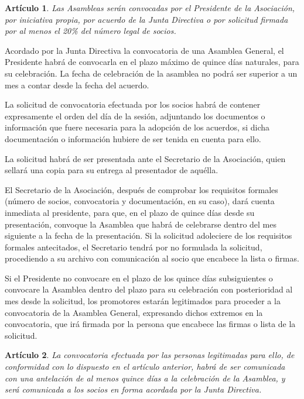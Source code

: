 \documentclass[a4paper,12pt]{article}
\theoremstyle{mystyle}		%
\newtheorem{art}{Artículo}	%
\begin{document}
\begin{onehalfspace}
\begin{art}
Las Asambleas serán convocadas por el Presidente de la Asociación, por iniciativa propia, por acuerdo de la Junta Directiva o por solicitud firmada por al menos el 20\% del número legal de socios.
\end{art}

Acordado por la Junta Directiva la convocatoria de una Asamblea General, el Presidente habrá de convocarla en el plazo máximo de quince días naturales, para su celebración. La fecha de celebración de la asamblea no podrá ser superior a un mes a contar desde la fecha del acuerdo.

La solicitud de convocatoria efectuada por los socios habrá de contener expresamente el orden del día de la sesión, adjuntando los documentos o información que fuere necesaria para la adopción de los acuerdos, si dicha documentación o información hubiere de ser tenida en cuenta para ello.

La solicitud habrá de ser presentada ante el Secretario de la Asociación, quien sellará una copia para su entrega al presentador de aquélla.

El Secretario de la Asociación, después de comprobar los requisitos formales (número de socios, convocatoria y documentación, en su caso), dará cuenta inmediata al presidente, para que, en el plazo de quince días desde su presentación, convoque la Asamblea que habrá de celebrarse dentro del mes siguiente a la fecha de la presentación. Si la solicitud adoleciere de los requisitos formales antecitados, el Secretario tendrá por no formulada la solicitud, procediendo a su archivo con comunicación al socio que encabece la lista o firmas.

Si el Presidente no convocare en el plazo de los quince días subsiguientes o convocare la Asamblea dentro del plazo para su celebración con posterioridad al mes desde la solicitud, los promotores estarán legitimados para proceder a la convocatoria de la Asamblea General, expresando dichos extremos en la convocatoria, que irá firmada por la persona que encabece las firmas o lista de la solicitud.

\begin{art}
La convocatoria efectuada por las personas legitimadas para ello, de conformidad con lo dispuesto en el artículo anterior, habrá de ser comunicada con una antelación de al menos quince días a la celebración de la Asamblea, y será comunicada a los socios en forma acordada por la Junta Directiva.
\end{art}


\end{onehalfspace}
\end{document}
